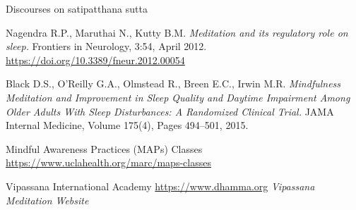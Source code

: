 \documentclass[a4paper, amsfonts, amssymb, amsmath, reprint, showkeys, nofootinbib, twoside]{revtex4-1}
\begin{document}
\begin{thebibliography}{99}
  Discourses on satipatthana sutta

  Nagendra R.P., Maruthai N., Kutty B.M.
  \textit{Meditation and its regulatory role on sleep.}
  Frontiers in Neurology, 3:54, April 2012.
  \url{https://doi.org/10.3389/fneur.2012.00054}

  Black D.S., O’Reilly G.A., Olmstead R., Breen E.C., Irwin M.R.
  \textit{Mindfulness Meditation and Improvement in Sleep Quality and Daytime Impairment
    Among Older Adults With Sleep Disturbances: A Randomized Clinical Trial.}
  JAMA Internal Medicine, Volume 175(4), Pages 494–501, 2015.

  Mindful Awareness Practices (MAPs) Classes
  \url{https://www.uclahealth.org/marc/maps-classes}

  Vipassana International Academy
  \url{https://www.dhamma.org}
  \textit{Vipassana Meditation Website}


\end{thebibliography}
\end{document}
